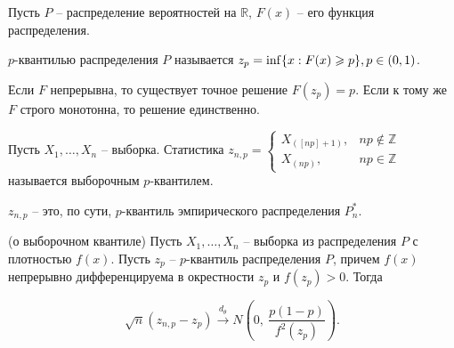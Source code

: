 Пусть $\displaystyle P$ -- распределение вероятностей на $\displaystyle \mathbb{R}$, $\displaystyle F( x)$ -- его функция распределения.
\begin{definition}
$\displaystyle p$-квантилью распределения $\displaystyle P$ называется $\displaystyle z_{p} =\inf\{x:F( x) \geqslant p\},\\ p \in (0,1)$.
\end{definition}
\begin{note}
Если $\displaystyle F$ непрерывна, то существует точное решение $\displaystyle F( z_{p}) =p$. Если к тому же $\displaystyle F$ строго монотонна, то решение единственно.
\end{note}
\begin{definition}
Пусть $\displaystyle X_{1} ,\dotsc ,X_{n}$ -- выборка. Статистика $\displaystyle z_{n,p} =\begin{cases}
X_{([ np] +1)}, & np\notin \mathbb{Z}\\
X_{( np)}, & np\in \mathbb{Z}
\end{cases}$ называется выборочным $\displaystyle p$-квантилем.
\end{definition}
\begin{note}
$\displaystyle z_{n,p}$ -- это, по сути, $\displaystyle p$-квантиль эмпирического распределения $\displaystyle P_{n}^{*}$.
\end{note}
\begin{theorem}
(о выборочном квантиле) Пусть $\displaystyle X_{1} ,\dotsc ,X_{n}$ -- выборка из распределения $\displaystyle P$ с плотностью $\displaystyle f( x)$. Пусть $\displaystyle z_{p}$ -- $\displaystyle p$-квантиль распределения $\displaystyle P$, причем $\displaystyle f( x)$ непрерывно дифференцируема в окрестности $\displaystyle z_{p}$ и $\displaystyle f( z_{p})  >0$. Тогда


\begin{equation*}
\sqrt{n}( z_{n,p} -z_{p})\xrightarrow{d_{\theta }} N\left( 0,\ \frac{p( 1-p)}{f^{2}( z_{p})}\right) .
\end{equation*}
\end{theorem}
